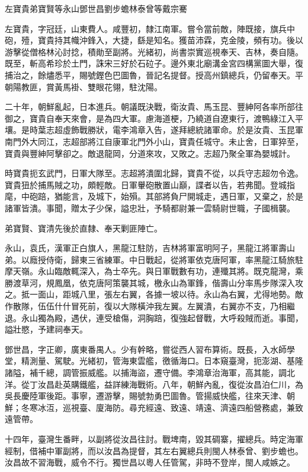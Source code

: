 
\begin{pinyinscope}
左寶貴弟寶賢等永山鄧世昌劉步蟾林泰曾等戴宗騫

左寶貴，字冠廷，山東費人。咸豐初，隸江南軍。嘗令當前敵，陣既接，旗兵中砲，殪，寶貴持其幟沖鋒入，大捷，繇是知名。獲苗沛霖，克金陵，頻有功。後以游擊從僧格林沁討捻，積勛至副將。光緒初，尚書崇實巡視奉天、吉林，奏自隨。既至，斬高希珍於土門，誅宋三好於石砬子。邊外東北廟溝金宮四構黨圖大舉，復捕治之，餘燼悉平，賜號鏗色巴圖魯，晉記名提督。授高州鎮總兵，仍留奉天。平朝陽教匪，賞黃馬褂、雙眼花翎，駐沈陽。

二十年，朝鮮亂起，日本進兵。朝議既決戰，衛汝貴、馬玉昆、豐紳阿各率所部往御之，寶貴自奉天來會，是為四大軍。慮海道梗，乃繞道自遼東行，渡鴨綠江入平壤。是時葉志超虛飾戰勝狀，電李鴻章入告，遂拜總統諸軍命。於是汝貴、玉昆軍南門外大同江，志超部將江自康軍北門外小山，寶貴任城守。未止舍，日軍猝至，寶貴與豐紳阿擊卻之。敵退龍岡，分道來攻，又敗之。志超乃聚全軍為嬰城計。

時寶貴扼玄武門，日軍大隊至。志超將潰圍北歸，寶貴不從，以兵守志超勿令逸。寶貴狃於捕馬賊之功，頗輕敵。日軍轝砲散置山巔，諜者以告，若弗聞。登城指麾，中砲踣，猶能言，及城下，始殞。其部將負尸開城走，遇日軍，又棄之，於是諸軍皆潰。事聞，贈太子少保，謚忠壯，予騎都尉兼一雲騎尉世職，子國楫襲。

弟寶賢、寶清先後於直隸、奉天剿匪陣亡。

永山，袁氏，漢軍正白旗人，黑龍江駐防，吉林將軍富明阿子，黑龍江將軍壽山弟。以廕授侍衛，歸東三省練軍。中日戰起，從將軍依克唐阿軍，率黑龍江騎旅駐摩天嶺。永山臨敵輒深入，為士卒先。與日軍戰數有功，連殲其將。既克龍灣，乘勝渡草河，規鳳凰，依克唐阿策襲其城，檄永山為軍鋒，偕壽山分率馬步隊深入攻之。抵一面山，距城八里，張左右翼，各據一坡以待。永山為右翼，尤得地勢。敵作散隊，伍伍什什冒死前，復以大隊橫沖我左翼。左翼潰，右翼亦不支，乃相繼退。永山獨為殿，遇伏，連受槍傷，洞胸踣，復強起督戰，大呼殺賊而逝。事聞，謚壯愍，予建祠奉天。

鄧世昌，字正卿，廣東番禺人。少有幹略，嘗從西人習布算術。既長，入水師學堂，精測量、駕駛。光緒初，管海東雲艦，徼循海口。日本窺臺灣，扼澎湖、基隆諸隘，補千總，調管振威艦。以捕海盜，遷守備。李鴻章治海軍，高其能，調北洋。從丁汝昌赴英購鐵艦，益詳練海戰術。八年，朝鮮內亂，復從汝昌泊仁川，為吳長慶陸軍後距。事寧，遷游擊，賜號勃勇巴圖魯。管揚威快艦，往來天津、朝鮮；冬寒冰沍，巡視臺、廈海防。尋充經遠、致遠、靖遠、濟遠四船營務處，兼致遠管帶。

十四年，臺灣生番畔，以副將從汝昌往討。戰埤南，毀其碉寨，擢總兵。時定海軍經制，借補中軍副將，而以汝昌為提督，其左右翼總兵則閩人林泰曾、劉步蟾也。汝昌故不習海戰，威令不行。獨世昌以粵人任管駕，非時不登岸，閩人咸嫉之。


\end{pinyinscope}
